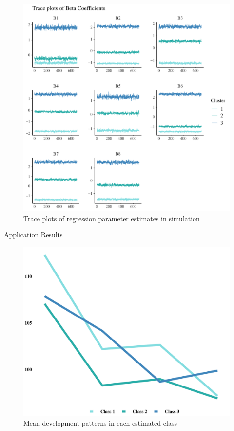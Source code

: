 \documentclass[final]{beamer}
\newlength{\onecolwid}
\begin{document}
\begin{frame}[t]
\begin{columns}[t]
\begin{column}{\onecolwid} %


\begin{figure}
\includegraphics[height=1\linewidth,width=1\linewidth]{beta_trace.pdf}
\caption{Trace plots of regression parameter estimates in simulation}
\end{figure}

\begin{block}{Application Results}

\begin{figure}
\includegraphics[height=0.8\linewidth,width=1\linewidth]{clust_trends.pdf}
\caption{Mean development patterns in each estimated class}
\end{figure}


\end{block}
\end{column}
\end{columns}
\end{frame}
\end{document}
